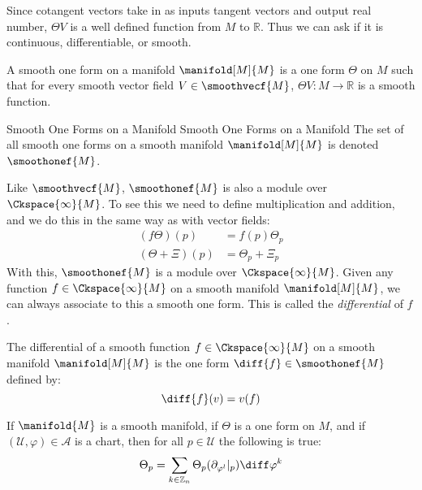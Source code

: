         Since cotangent vectors take in as inputs tangent vectors and output
        real number, $\Theta{V}$ is a well defined function from $M$ to
        $\mathbb{R}$. Thus we can ask if it is continuous, differentiable,
        or smooth.
        \begin{definition}
            A smooth one form on a manifold $\manifold[M]{M}$ is a one form
            $\Theta$ on $M$ such that for every smooth vector field
            $V\in\smoothvecf{M}$, $\Theta{V}:M\rightarrow\mathbb{R}$ is a
            smooth function.
        \end{definition}
        \begin{fnotation}{Smooth One Forms on a Manifold}
                         {Smooth One Forms on a Manifold}
            The set of all smooth one forms on a smooth manifold
            $\manifold[M]{M}$ is denoted $\smoothonef{M}$.
        \end{fnotation}
        Like $\smoothvecf{M}$, $\smoothonef{M}$ is also a module over
        $\Ckspace{\infty}{M}$. To see this we need to define multiplication
        and addition, and we do this in the same way as with vector fields:
        \begin{align}
            (f\Theta)(p)&=f(p)\Theta_{p}\\
            (\Theta+\Xi)(p)&=\Theta_{p}+\Xi_{p}
        \end{align}
        With this, $\smoothonef{M}$ is a module over $\Ckspace{\infty}{M}$.
        Given any function $f\in\Ckspace{\infty}{M}$ on a smooth manifold
        $\manifold[M]{M}$, we can always associate to this a smooth one
        form. This is called the \textit{differential} of $f$.
        \begin{definition}
            The differential of a smooth function $f\in\Ckspace{\infty}{M}$
            on a smooth manifold $\manifold[M]{M}$ is the one form
            $\diff{f}\in\smoothonef{M}$ defined by:
            \begin{equation}
                \diff{f}(v)=v(f)
            \end{equation}
        \end{definition}
        \begin{theorem}
            If $\manifold{M}$ is a smooth manifold, if $\Theta$ is a one
            form on $M$, and if $(\mathcal{U},\varphi)\in\mathcal{A}$ is a
            chart, then for all $p\in\mathcal{U}$ the following is true:
            \begin{equation}
                \Theta_{p}=\sum_{k\in\mathbb{Z}_{n}}
                    \Theta_{p}(\partial_{\varphi^{l}}|_{p})\diff\varphi^{k}
            \end{equation}
        \end{theorem}
